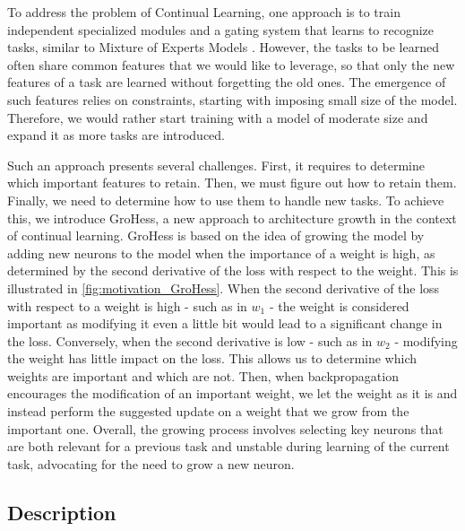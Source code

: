\documentclass[11pt]{article}
\begin{document}
To address the problem of Continual Learning, one approach is to train independent specialized modules and a gating system that learns to recognize tasks, similar to Mixture of Experts Models \cite{moe_1}\cite{moe_2}. However, the tasks to be learned often share common features that we would like to leverage, so that only the new features of a task are learned without forgetting the old ones. The emergence of such features relies on constraints, starting with imposing small size of the model. Therefore, we would rather start training with a model of moderate size and expand it as more tasks are introduced.

\vspace{2mm}
\noindent
Such an approach presents several challenges. First, it requires to determine which important features to retain. Then, we must figure out how to retain them. Finally, we need to determine how to use them to handle new tasks. To achieve this, we introduce GroHess, a new approach to architecture growth in the context of continual learning. GroHess is based on the idea of growing the model by adding new neurons to the model when the importance of a weight is high, as determined by the second derivative of the loss with respect to the weight. This is illustrated in \ref{fig:motivation_GroHess}. When the second derivative of the loss with respect to a weight is high - such as in $w_1$ - the weight is considered important as modifying it even a little bit would lead to a significant change in the loss. Conversely, when the second derivative is low - such as in $w_2$ - modifying the weight has little impact on the loss. This allows us to determine which weights are important and which are not. Then, when backpropagation encourages the modification of an important weight, we let the weight as it is and instead perform the suggested update on a weight that we grow from the important one. Overall, the growing process involves selecting key neurons that are both relevant for a previous task and unstable during learning of the current task, advocating for the need to grow a new neuron.


\subsection{Description}
\end{document}
